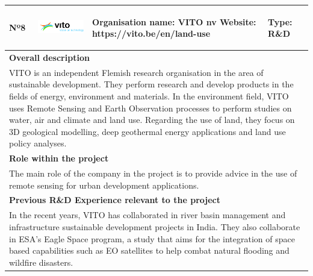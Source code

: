 \begin{longtable}[H]{|p{0.7cm}|p{4cm}|p{7cm}|p{1.3cm}|}
	\hline
	\begin{center} Nº8 \end{center} & \begin{center} \includegraphics[scale=0.35]{./logos/vito-logo} \end{center} & \begin{center} \textbf{Organisation name:} VITO nv \newline \textbf{Website:} https://vito.be/en/land-use \end{center} & \begin{center} Type: \newline R\&D \end{center} \\ \hline
	
	\multicolumn{4}{|p{13cm}|}{\textbf{Overall description}}  \\ \hline
	
	\multicolumn{4}{|p{14.5cm}|}{VITO is an independent Flemish research organisation in the area of sustainable development. They perform research and develop products in the fields of energy, environment and materials. In the environment field, VITO uses Remote Sensing and Earth Observation processes to perform studies on water, air and climate and land use. Regarding the use of land, they focus on 3D geological modelling, deep geothermal energy applications and land use policy analyses.}  \\ \hline
	
	\multicolumn{4}{|p{13cm}|}{\textbf{Role within the project}}   \\ \hline
	
	\multicolumn{4}{|p{14.5cm}|}{The main role of the company in the project is to provide advice in the use of remote sensing for urban development applications.}  \\ \hline
	
	\multicolumn{4}{|p{13cm}|}{\textbf{Previous R\&D Experience relevant to the project}}  \\ \hline
	
	\multicolumn{4}{|p{14.5cm}|}{In the recent years, VITO has collaborated in river basin management and infrastructure sustainable development projects in India. They also collaborate in ESA's Eagle Space program, a study that aims for the integration of space based capabilities such as EO satellites to help combat natural flooding and wildfire disasters.}  \\ \hline
	

\end{longtable}
